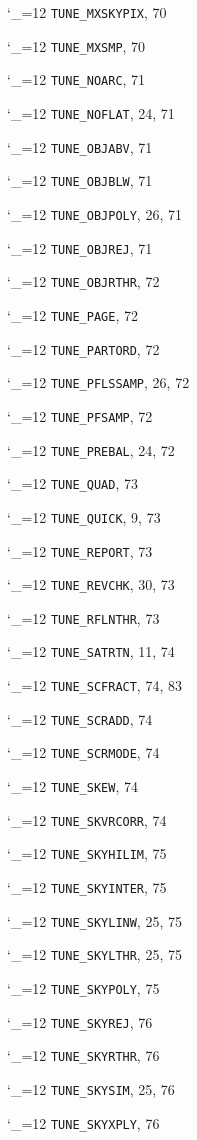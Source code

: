 \documentclass[11pt,twoside]{article}
\newcommand{\cmdname}{\begingroup \catcode`\_=12 \realcmdname}
\newcommand{\realcmdname}[1]{\endgroup\texttt{#1}}
\begin{document}
\begin{theindex}
  \item \cmdname {TUNE_MXSKYPIX}, 70
  \item \cmdname {TUNE_MXSMP}, 70
  \item \cmdname {TUNE_NOARC}, 71
  \item \cmdname {TUNE_NOFLAT}, 24, 71
  \item \cmdname {TUNE_OBJABV}, 71
  \item \cmdname {TUNE_OBJBLW}, 71
  \item \cmdname {TUNE_OBJPOLY}, 26, 71
  \item \cmdname {TUNE_OBJREJ}, 71
  \item \cmdname {TUNE_OBJRTHR}, 72
  \item \cmdname {TUNE_PAGE}, 72
  \item \cmdname {TUNE_PARTORD}, 72
  \item \cmdname {TUNE_PFLSSAMP}, 26, 72
  \item \cmdname {TUNE_PFSAMP}, 72
  \item \cmdname {TUNE_PREBAL}, 24, 72
  \item \cmdname {TUNE_QUAD}, 73
  \item \cmdname {TUNE_QUICK}, 9, 73
  \item \cmdname {TUNE_REPORT}, 73
  \item \cmdname {TUNE_REVCHK}, 30, 73
  \item \cmdname {TUNE_RFLNTHR}, 73
  \item \cmdname {TUNE_SATRTN}, 11, 74
  \item \cmdname {TUNE_SCFRACT}, 74, 83
  \item \cmdname {TUNE_SCRADD}, 74
  \item \cmdname {TUNE_SCRMODE}, 74
  \item \cmdname {TUNE_SKEW}, 74
  \item \cmdname {TUNE_SKVRCORR}, 74
  \item \cmdname {TUNE_SKYHILIM}, 75
  \item \cmdname {TUNE_SKYINTER}, 75
  \item \cmdname {TUNE_SKYLINW}, 25, 75
  \item \cmdname {TUNE_SKYLTHR}, 25, 75
  \item \cmdname {TUNE_SKYPOLY}, 75
  \item \cmdname {TUNE_SKYREJ}, 76
  \item \cmdname {TUNE_SKYRTHR}, 76
  \item \cmdname {TUNE_SKYSIM}, 25, 76
  \item \cmdname {TUNE_SKYXPLY}, 76

\end{theindex}
\end{document}
